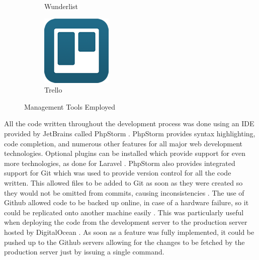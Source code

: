 \begin{figure}[H]
\begin{subfigure}[t]{0.15\linewidth}
		\caption{Wunderlist}\label{fig:Wunderlist}
	\end{subfigure}
    \quad
	\begin{subfigure}[t]{0.15\linewidth}
		\centering
		\includegraphics[width=\linewidth]{Images/Generic/Icons/Trello}
		\caption{Trello}\label{fig:Trello}
	\end{subfigure}
	\caption{Management Tools Employed}\label{fig:ManagementTools}
\end{figure}

All the code written throughout the development process was done using an IDE provided by JetBrains called PhpStorm \cite{JetBrains:PHPStorm}. PhpStorm provides syntax highlighting, code completion, and numerous other features for all major web development technologies. Optional plugins can be installed which provide support for even more technologies, as done for Laravel \cite{JetBrains:PHPStorm}. PhpStorm also provides integrated support for Git which was used to provide version control for all the code written. This allowed files to be added to Git as soon as they were created so they would not be omitted from commits, causing inconsistencies \cite{JetBrains:PHPStorm}. The use of Github allowed code to be backed up online, in case of a hardware failure, so it could be replicated onto another machine easily \cite{Github:Home}. This was particularly useful when deploying the code from the development server to the production server hosted by DigitalOcean \cite{DigitalOcean:Home}. As soon as a feature was fully implemented, it could be pushed up to the Github servers allowing for the changes to be fetched by the production server just by issuing a single command. 

